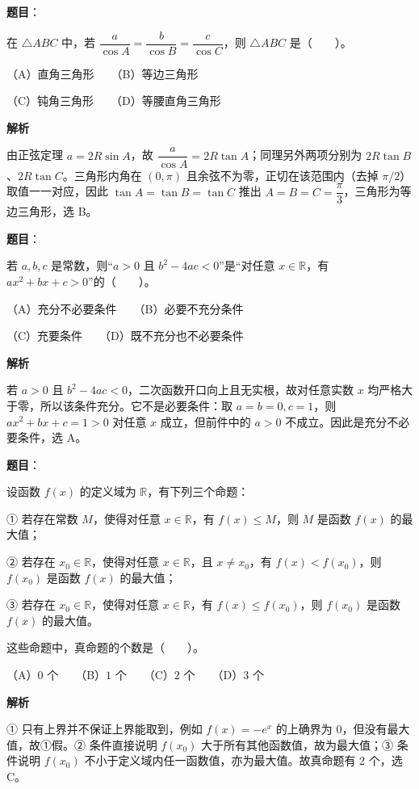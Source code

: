 \begin{answer}

\textbf{题目}：

在 $\triangle ABC$ 中，若 $\dfrac{a}{\cos A}=\dfrac{b}{\cos B}=\dfrac{c}{\cos C}$，则 $\triangle ABC$ 是\mbox{（　　）}。

（A）直角三角形　　（B）等边三角形

（C）钝角三角形　　（D）等腰直角三角形

\textbf{解析}

由正弦定理 $a=2R\sin A$，故 $\dfrac a{\cos A}=2R\tan A$；同理另外两项分别为 $2R\tan B$、$2R\tan C$。三角形内角在 $(0,\pi)$ 且余弦不为零，正切在该范围内（去掉 $\pi/2$）取值一一对应，因此 $\tan A=\tan B=\tan C$ 推出 $A=B=C=\dfrac\pi3$，三角形为等边三角形，选 B。


\end{answer}
\begin{answer}

\textbf{题目}：

若 $a,b,c$ 是常数，则“$a>0$ 且 $b^2-4ac<0$”是“对任意 $x\in\mathbb R$，有 $ax^2+bx+c>0$”的\mbox{（　　）}。

（A）充分不必要条件　　（B）必要不充分条件

（C）充要条件　　（D）既不充分也不必要条件

\textbf{解析}

若 $a>0$ 且 $b^2-4ac<0$，二次函数开口向上且无实根，故对任意实数 $x$ 均严格大于零，所以该条件充分。它不是必要条件：取 $a=b=0,c=1$，则 $ax^2+bx+c=1>0$ 对任意 $x$ 成立，但前件中的 $a>0$ 不成立。因此是充分不必要条件，选 A。


\end{answer}
\begin{answer}

\textbf{题目}：

设函数 $f(x)$ 的定义域为 $\mathbb R$，有下列三个命题：

① 若存在常数 $M$，使得对任意 $x\in\mathbb R$，有 $f(x)\le M$，则 $M$ 是函数 $f(x)$ 的最大值；

② 若存在 $x_0\in\mathbb R$，使得对任意 $x\in\mathbb R$，且 $x\ne x_0$，有 $f(x)<f(x_0)$，则 $f(x_0)$ 是函数 $f(x)$ 的最大值；

 ③ 若存在 $x_0\in\mathbb R$，使得对任意 $x\in\mathbb R$，有 $f(x)\le f(x_0)$，则 $f(x_0)$ 是函数 $f(x)$ 的最大值。

这些命题中，真命题的个数是\mbox{（　　）}。

（A）$0$ 个　　（B）$1$ 个　　（C）$2$ 个　　（D）$3$ 个

\textbf{解析}

① 只有上界并不保证上界能取到，例如 $f(x)=-e^x$ 的上确界为 $0$，但没有最大值，故①假。② 条件直接说明 $f(x_0)$ 大于所有其他函数值，故为最大值；③ 条件说明 $f(x_0)$ 不小于定义域内任一函数值，亦为最大值。故真命题有 2 个，选 C。


\end{answer}
